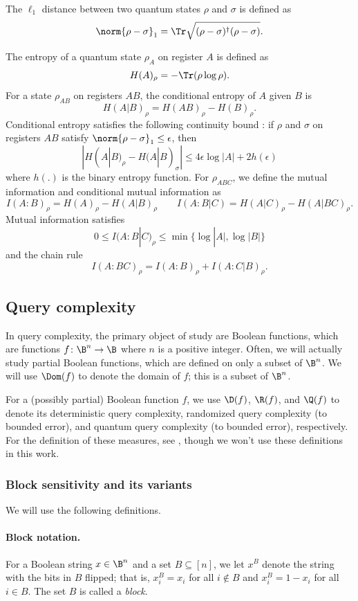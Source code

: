 The $\ell_1$ distance between two quantum states $\rho$ and $\sigma$ is defined as
\[ \norm{\rho-\sigma}_1 = \Tr\sqrt{(\rho-\sigma)^\dagger(\rho-\sigma)}.\]

The entropy of a quantum state $\rho_A$ on register $A$ is defined as
\[H(A)_\rho = -\Tr(\rho\log\rho).\]
For a state $\rho_{AB}$ on registers $AB$, the conditional entropy of $A$ given $B$ is
\[ H(A|B)_\rho = H(AB)_\rho - H(B)_\rho.\]
Conditional entropy satisfies the following continuity bound \cite{AF04}: if $\rho$ and $\sigma$ on registers $AB$ satisfy $\norm{\rho-\sigma}_1 \leq \epsilon$, then
\[ |H(A|B)_\rho - H(A|B)_\sigma| \leq 4\epsilon\log|A| + 2h(\epsilon) \]
where $h(.)$ is the binary entropy function.
For $\rho_{ABC}$, we define the mutual information and conditional mutual information as
\[ I(A:B)_\rho = H(A)_\rho - H(A|B)_\rho \qquad I(A:B|C) = H(A|C)_\rho - H(A|BC)_\rho. \]
Mutual information satisfies
\[ 0 \leq I(A:B|C)_\rho \leq \min\{\log|A|,\log|B|\}\]
and the chain rule
\[ I(A:BC)_\rho = I(A:B)_\rho + I(A:C|B)_\rho.\]


\subsection{Query complexity}\label{sec:prelim_query}

In query complexity, the primary object of study
are Boolean functions, which are functions
$f\colon\B^n\to\B$ where $n$ is a positive integer. Often,
we will actually study partial Boolean functions, which
are defined on only a subset of $\B^n$. We will use
$\Dom(f)$ to denote the domain of $f$; this is a subset
of $\B^n$.

For a (possibly partial) Boolean function $f$, we use
$\D(f)$, $\R(f)$, and $\Q(f)$ to denote its deterministic
query complexity, randomized query complexity (to bounded error),
and quantum query complexity (to bounded error), respectively.
For the definition of these measures, see \cite{BdW02},
though we won't use these definitions in this work.

\subsubsection{Block sensitivity and its variants}

We will use the following definitions.

\paragraph{Block notation.} For a Boolean string $x\in\B^n$
and a set $B\subseteq[n]$, we let $x^B$ denote the
string with the bits in $B$ flipped; that is,
$x^B_i=x_i$ for all $i\notin B$ and $x^B_i=1-x_i$ for all $i\in B$.
The set $B$ is called a \emph{block}.


